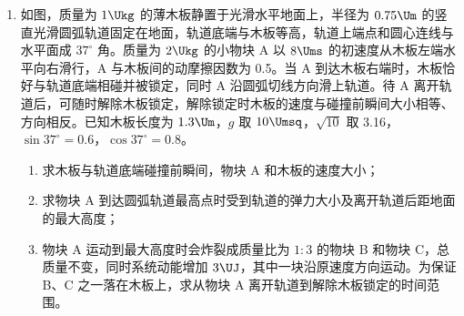 \documentclass[\gkver]{gaokaozhenti}
\begin{document}
\begin{enumerate}
{$CK=r_{1}-r_{1}\cos 30^\circ=\frac{\sqrt{3}}{2}a-\frac{3}{4}a$

则

$IJ=IH=\frac{1}{2}FH-CK=\frac{2-\sqrt{3}}{2}a$

粒子在磁场中的运动时间为

$t_{1}=2\times\frac{30^\circ}{360^\circ}\times\frac{2\pi m}{qB}=\frac{\pi m}{3qB}$

粒子在无磁场区域运动的时间为

$t_{2}=\frac{IJ}{v}=\frac{(2\sqrt{3}-3)m}{3qB}$

粒子从 $C$ 点运动到 $E$ 点的时间为

$t=t_{1}+t_{2}=\frac{(2\sqrt{3}-3+\pi)m}{3qB}$

}

\item
如图，质量为 $1\Ukg$ 的薄木板静置于光滑水平地面上，半径为 $0.75\Um$ 的竖直光滑圆弧轨道固定在地面，轨道底端与木板等高，轨道上端点和圆心连线与水平面成 $37^\circ$ 角。质量为 $2\Ukg$ 的小物块 A 以 $8\Ums$ 的初速度从木板左端水平向右滑行，A 与木板间的动摩擦因数为 0.5。当 A 到达木板右端时，木板恰好与轨道底端相碰并被锁定，同时 A 沿圆弧切线方向滑上轨道。待 A 离开轨道后，可随时解除木板锁定，解除锁定时木板的速度与碰撞前瞬间大小相等、方向相反。已知木板长度为 $1.3\Um$，$g$ 取 $10\Umsq$，$\sqrt{10}$ 取 3.16，$\sin 37^\circ=0.6$，$\cos 37^\circ=0.8$。
\begin{enumerate}
	\item
	求木板与轨道底端碰撞前瞬间，物块 A 和木板的速度大小；
	\item
	求物块 A 到达圆弧轨道最高点时受到轨道的弹力大小及离开轨道后距地面的最大高度；
	\item
	物块 A 运动到最大高度时会炸裂成质量比为 $1:3$ 的物块 B 和物块 C，总质量不变，同时系统动能增加 $3\UJ$，其中一块沿原速度方向运动。为保证 B、C 之一落在木板上，求从物块 A 离开轨道到解除木板锁定的时间范围。
\end{enumerate}


\end{enumerate}
\end{document}

